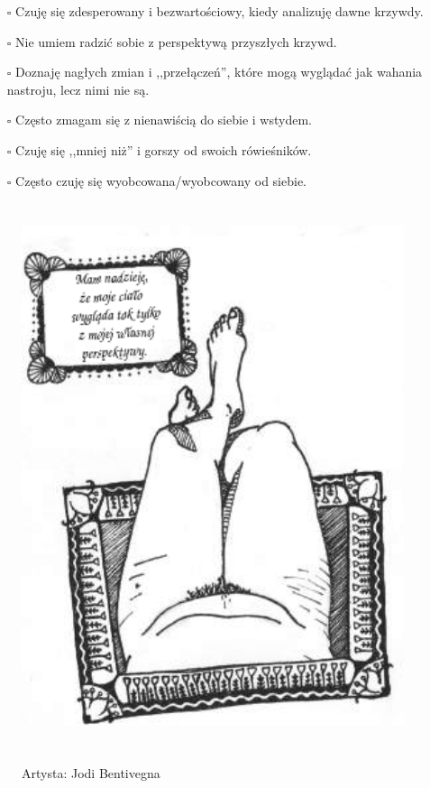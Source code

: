 \begin{multicols}{2}
\begin{itemize}
\item[$\square$]{Czuję się zdesperowany i bezwartościowy, kiedy analizuję dawne krzywdy.}
\item[$\square$]{Nie umiem radzić sobie z perspektywą przyszłych krzywd.}
\item[$\square$]{Doznaję nagłych zmian i ,,przełączeń'', które mogą wyglądać jak wahania nastroju, lecz nimi nie są.}
\item[$\square$]{Często zmagam się z nienawiścią do siebie i wstydem.}
\item[$\square$]{Czuję się ,,mniej niż'' i gorszy od swoich rówieśników.}
\item[$\square$]{Często czuję się wyobcowana/wyobcowany od siebie.}
\end{itemize}
\end{multicols}

\begin{figure}[h]
\centering
\includegraphics[height=16cm]{TeX_files/2-2-napis.png}
\label{2-2}
\begin{flushright}
Artysta: Jodi Bentivegna
\end{flushright}
\end{figure}

